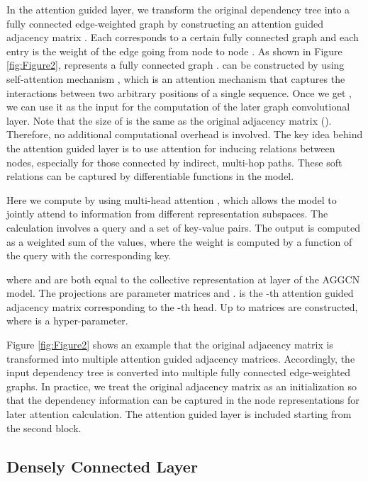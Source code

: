 \documentclass[11pt,a4paper]{article}
\begin{document}
In the attention guided layer, we transform the original dependency tree into a fully connected edge-weighted graph by 
constructing an attention guided adjacency matrix . Each  corresponds to a certain fully connected graph and each entry  is the weight of the edge going from node  to node . As shown in Figure \ref{fig:Figure2},  represents a fully connected graph .  can be constructed by using self-attention mechanism \citep{Cheng2016LongSM}, which is an attention mechanism \citep{Bahdanau2015NeuralMT} that captures the interactions between two arbitrary positions of a single sequence. Once we get , we can use it as the input for the computation of the later graph convolutional layer. Note that the size of  is the same as the original adjacency matrix  (). Therefore, no additional computational overhead is involved. The key idea behind the attention guided layer is to use attention for inducing relations between nodes, especially for those connected by indirect, multi-hop paths. These soft relations can be captured by differentiable functions in the model. 

Here we compute  by using multi-head attention \citep{Vaswani2017AttentionIA}, which allows the model to jointly attend to information from different representation subspaces. The calculation involves a query and a set of key-value pairs. The output is computed as a weighted sum of the values, where the weight is computed by a function of the query with the corresponding key.


where  and  are both equal to the collective representation  at layer  of the AGGCN model. The projections are parameter matrices  and .  is the -th attention guided adjacency matrix corresponding to the -th head. Up to  matrices are constructed, where  is a hyper-parameter.


Figure \ref{fig:Figure2} shows an example that the original adjacency matrix is transformed into multiple attention guided adjacency matrices. Accordingly, the input dependency tree is converted into multiple fully connected edge-weighted graphs. In practice, we treat the original adjacency matrix as an initialization so that the dependency information can be captured in the node representations for later attention calculation. The attention guided layer is included starting from the second block.

\subsection{Densely Connected Layer}
\label{ssec:2.3}
\end{document}
